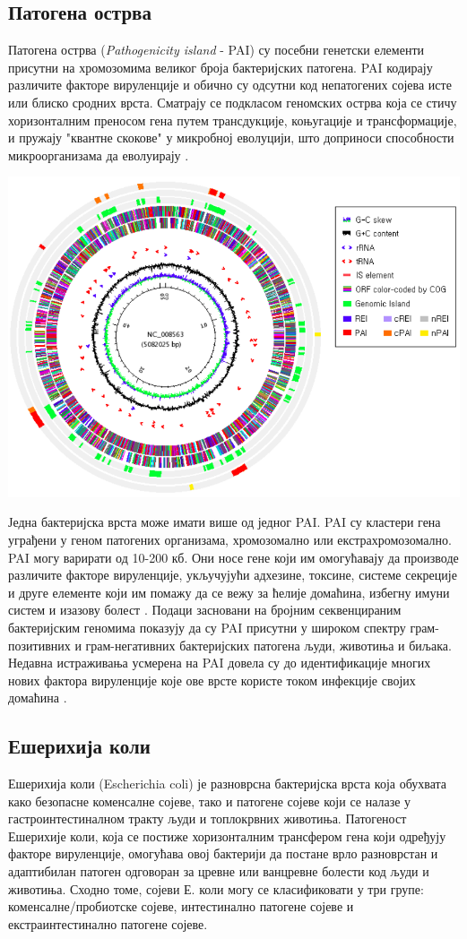 \documentclass[12pt]{article}
\begin{document}
\subsection{Патогена острва}

Патогена острва (\textit{Pathogenicity island} - PAI) су посебни генетски елементи присутни на хромозомима великог броја бактеријских патогена. PAI кодирају различите факторе вируленције и обично су одсутни код непатогених сојева исте или блиско сродних врста. Сматрају се подкласом геномских острва која се стичу хоризонталним преносом гена путем трансдукције, коњугације и трансформације, и пружају "квантне скокове" у микробној еволуцији, што доприноси способности микроорганизама да еволуирају \cite{Gal-Mor2006-dv}. 

\begin{center}
\includegraphics[width=0.5\linewidth]{images/paidb.png}
\end{center}

Једна бактеријска врста може имати више од једног PAI. PAI су кластери гена уграђени у геном патогених организама, хромозомално или екстрахромозомално. PAI могу варирати од 10-200 кб. Они носе гене који им омогућавају да производе различите факторе вируленције, укључујући адхезине, токсине, системе секреције и друге елементе који им помажу да се вежу за ћелије домаћина, избегну имуни систем и изазову болест \cite{Schmidt2004-xj}. Подаци засновани на бројним секвенцираним бактеријским геномима показују да су PAI присутни у широком спектру грам-позитивних и грам-негативних бактеријских патогена људи, животиња и биљака. Недавна истраживања усмерена на PAI довела су до идентификације многих нових фактора вируленције које ове врсте користе током инфекције својих домаћина \cite{Gal-Mor2006-dv}.

\subsection{Ешерихија коли}

Ешерихија коли (Escherichia coli) је разноврсна бактеријска врста која обухвата како безопасне коменсалне сојеве, тако и патогене сојеве који се налазе у гастроинтестиналном тракту људи и топлокрвних животиња. Патогеност Ешерихије коли, која се постиже хоризонталним трансфером гена који одређују факторе вируленције, омогућава овој бактерији да постане врло разноврстан и адаптибилан патоген одговоран за цревне или ванцревне болести код људи и животиња. Сходно томе, сојеви Е. коли могу се класификовати у три групе: коменсалне/пробиотске сојеве, интестинално патогене сојеве и екстраинтестинално патогене сојеве.
\end{document}
